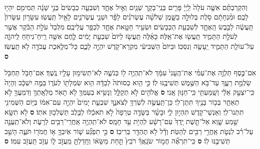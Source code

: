 \documentclass[twoside, openany, parskip=half, 11pt]{book}
\begin{document}
\begin{footnotesize}
\begin{multicols}{2}
\\
וְהִקְרַבְתֶּ֨ם אִשֶּׁ֤ה עֹלָה֙ לַֽיְיָ֔ פָּרִ֧ים בְּנֵֽי־בָקָ֛ר שְׁנַ֖יִם וְאַ֣יִל אֶחָ֑ד וְשִׁבְעָ֤ה כְבָשִׂים֙ בְּנֵ֣י שָׁנָ֔ה תְּמִימִ֖ם יִהְי֥וּ לָכֶֽם׃ וּמִ֨נְחָתָ֔ם סֹ֖לֶת בְּלוּלָ֣ה בַשָּׁ֑מֶן שְׁלֹשָׁ֨ה עֶשְׂרֹנִ֜ים לַפָּ֗ר וּשְׁנֵ֧י עֶשְׂרֹנִ֛ים לָאַ֖יִל תַּֽעֲשֽׂוּ׃ עִשָּׂר֤וֹן עִשָּׂרוֹן֙ תַּֽעֲשֶׂ֔ה לַכֶּ֖בֶשׂ הָֽאֶחָ֑ד לְשִׁבְעַ֖ת הַכְּבָשִֽׂים׃ וּשְׂעִ֥יר חַטָּ֖את אֶחָ֑ד לְכַפֵּ֖ר עֲלֵיכֶֽם׃ מִלְּבַד֙ עֹלַ֣ת הַבֹּ֔קֶר אֲשֶׁ֖ר לְעֹלַ֣ת הַתָּמִ֑יד תַּֽעֲשׂ֖וּ אֶת־אֵֽלֶּה׃ כָּאֵ֜לֶּה תַּֽעֲשׂ֤וּ לַיּוֹם֙ שִׁבְעַ֣ת יָמִ֔ים לֶ֛חֶם אִשֵּׁ֥ה רֵֽיחַ־נִיחֹ֖חַ לַֽיהוָֹ֑ה עַל־עוֹלַ֧ת הַתָּמִ֛יד יֵֽעָשֶׂ֖ה וְנִסְכּֽוֹ׃ וּבַיּוֹם֙ הַשְּׁבִיעִ֔י מִקְרָא־קֹ֖דֶשׁ יִהְיֶ֣ה לָכֶ֑ם כָּל־מְלֶ֥אכֶת עֲבֹדָ֖ה לֹ֥א תַֽעֲשֽׂוּ׃ \textbf{ס} 

אִם־כֶּ֣סֶף תַּלְוֶ֣ה אֶת־עַמִּ֗י אֶת־הֶֽעָנִי֙ עִמָּ֔ךְ לֹא־תִֽהְיֶ֥ה ל֖וֹ כְּנֹשֶׁ֑ה לֹֽא־תְשִׂימ֥וּן עָלָ֖יו נֶֽשֶׁךְ׃ אִם־חָבֹ֥ל תַּחְבֹּ֖ל שַׂלְמַ֣ת רֵעֶ֑ךָ עַד־בֹּ֥א הַשֶּׁ֖מֶשׁ תְּשִׁיבֶ֥נּוּ לֽוֹ׃ כִּ֣י הִ֤וא כְסוּתֹה֙ לְבַדָּ֔הּ הִ֥וא שִׂמְלָת֖וֹ לְעֹר֑וֹ בַּמֶּ֣ה יִשְׁכָּ֔ב וְהָיָה֙ כִּֽי־יִצְעַ֣ק אֵלַ֔י וְשָֽׁמַעְתִּ֖י כִּֽי־חַנּ֥וּן אָֽנִי׃ \textbf{ס} 
 אֱלֹהִ֖ים לֹ֣א תְקַלֵּ֑ל וְנָשִׂ֥יא בְעַמְּךָ֖ לֹ֥א תָאֹֽר׃ מְלֵאָֽתְךָ֥ וְדִמְעֲךָ֖ לֹ֣א תְאַחֵ֑ר בְּכ֥וֹר בָּנֶ֖יךָ תִּתֶּן־לִֽי׃ כֵּן־תַּֽעֲשֶׂ֥ה לְשֹֽׁרְךָ֖ לְצֹאנֶ֑ךָ שִׁבְעַ֤ת יָמִים֙ יִהְיֶ֣ה עִם־אִמּ֔וֹ בַּיּ֥וֹם הַשְּׁמִינִ֖י תִּתְּנוֹ־לִֽי׃ וְאַנְשֵׁי־קֹ֖דֶשׁ תִּהְי֣וּן לִ֑י וּבָשָׂ֨ר בַּשָּׂדֶ֤ה טְרֵפָה֙ לֹ֣א תֹאכֵ֔לוּ לַכֶּ֖לֶב תַּשְׁלִכ֥וּן אֹתֽוֹ׃ \textbf{ס} לֹ֥א תִשָּׂ֖א שֵׁ֣מַע שָׁ֑וְא אַל־תָּ֤שֶׁת יָֽדְךָ֙ עִם־רָשָׁ֔ע לִֽהְיֹ֖ת עֵ֥ד חָמָֽס׃ לֹא־תִֽהְיֶ֥ה אַֽחֲרֵֽי־רַבִּ֖ים לְרָעֹ֑ת וְלֹא־תַֽעֲנֶ֣ה עַל־רִ֗ב לִנְטֹ֛ת אַֽחֲרֵ֥י רַבִּ֖ים לְהַטֹּֽת׃ וְדָ֕ל לֹ֥א תֶהְדַּ֖ר בְּרִיבֽוֹ׃ \textbf{ס} כִּ֣י תִפְגַּ֞ע שׁ֧וֹר אֹֽיִבְךָ֛ א֥וֹ חֲמֹר֖וֹ תֹּעֶ֑ה הָשֵׁ֥ב תְּשִׁיבֶ֖נּוּ לֽוֹ׃ \textbf{ס} כִּֽי־תִרְאֶ֞ה חֲמ֣וֹר שֹׂנַֽאֲךָ֗ רֹבֵץ֙ תַּ֣חַת מַשָּׂא֔וֹ וְחָֽדַלְתָּ֖ מֵֽעֲזֹ֣ב ל֑וֹ עָזֹ֥ב תַּֽעֲזֹ֖ב עִמּֽוֹ׃ \textbf{ס} 

\end{multicols}
\end{footnotesize}
\end{document}
